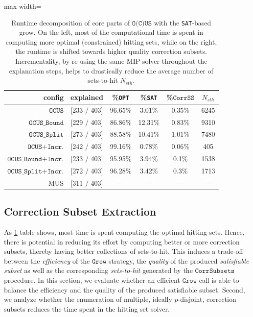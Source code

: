 \documentclass[twoside,11pt]{article}
\newcommand\mm[1]{\ensuremath{#1}\xspace}
\newcommand\call[1]{\mm{\texttt{#1}}}
\newcommand\sat{\texttt{{SAT}}\xspace}
\newcommand\grow{\mm{\call{Grow}}}
\newcommand\comus{\mm{\call{OCUS}}}
\newcommand{\comusbound}{\mm{\call{OCUS\_Bound}}}
\newcommand\comusincr{\mm{\call{OCUS+Incr.}}}
\newcommand\ousbiter{\mm{\call{OCUS\_Split}}}
\newcommand\ousbincr{\mm{\call{OCUS\_Bound+Incr.}}}
\newcommand\ousbiterincr{\mm{\call{OCUS\_Split+Incr.}}}
\newcommand\corrss{\mm{\call{CorrSS}}}
\newcommand\corrsubsets{\mm{\call{CorrSubsets}}}
\begin{document}
\begin{table}[!h]
	\centering
	\begin{adjustbox}{max width=\textwidth}
		\begin{tabular}{r|c|c|c|c|c}
			\textbf{config}             &  explained  &  \%\texttt{OPT} &   \%\sat & \%\corrss &  $N_{sth}$ \\ \midrule
			\comus                      & [233 / 403] &          96.65\% &  3.01\% & 0.35\% &      6245     \\
			\comusbound                 & [229 / 403] &          86.86\% & 12.31\% & 0.83\% &      9310     \\
			\ousbiter                       & [273 / 403] &          88.58\% & 10.41\% & 1.01\% &      7480     \\\midrule
			\comusincr                  & [242 / 403] &          99.16\% &  0.78\% & 0.06\% &       405     \\
			\ousbincr  			        & [233 / 403] &          95.95\% &  3.94\% &  0.1\% &      1538     \\
			\ousbiterincr               & [272 / 403] &          96.28\% &  3.42\% &  0.3\% &      1713     \\\midrule
			MUS                          & [311 / 403] &              --- &     --- &    --- &       ---    \\
		\end{tabular}
	\end{adjustbox}
	\caption{Runtime decomposition of core parts of \call{O(C)US} with the \sat-based grow. On the left, most of the computational time is spent in computing more optimal (constrained) hitting sets, while on the right, the runtime is shifted towards higher quality  correction subsets. Incrementality, by re-using the same MIP solver throughout the explanation steps, helps to drastically reduce the average number of sets-to-hit $N_{sth}$.}
	\label{tab:runtime-decomposition}
\end{table}


\subsection{Correction Subset Extraction}

	As \cref{tab:runtime-decomposition} table shows, most time is spent computing the optimal hitting sets. Hence, there is potential in reducing its effort by computing better or more correction subsets, thereby having better collections of sets-to-hit.
This induces a trade-off between the \emph{efficiency} of the \grow strategy, the \emph{quality} of the produced \emph{satisfiable subset} as well as the corresponding \emph{sets-to-hit} generated by the \corrsubsets procedure. 
In this section, we evaluate whether an efficient \grow-call is able to balance the efficiency and the quality of the produced satisfiable subset. Second, we analyze whether the enumeration of multiple, ideally $p$-disjoint, correction subsets 
reduces the time spent in the hitting set solver.
\end{document}
